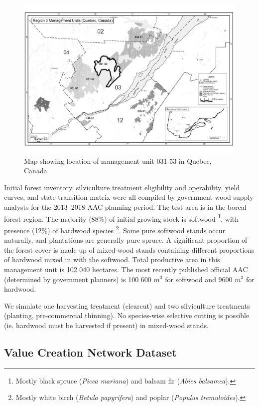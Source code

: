 \begin{figure}[ht!]
\caption{Map showing location of management unit 031-53 in Quebec, Canada}
\label{fig:uaf03153}
\centering{}\includegraphics[width=\textwidth]{images/region-03_highlight}
\end{figure}
 

Initial forest inventory, silviculture treatment eligibility and
operability, yield curves, and state transition matrix were all
compiled by government wood supply analysts for the 2013--2018 AAC
planning period. The test area is in the boreal forest region. The majority
(88\%) of initial growing stock is softwood%
\footnote{Mostly black spruce (\emph{Picea mariana}) and balsam fir
  (\emph{Abies balsamea}).%
}, with presence (12\%) of hardwood species%
\footnote{Mostly white birch (\emph{Betula papyrifera}) and poplar
  (\emph{Populus tremuloides}).%
}. Some pure softwood stands occur naturally, and plantations are
generally pure spruce. A significant proportion of the forest cover is
made up of mixed-wood stands containing different proportions of
hardwood mixed in with the softwood. Total productive area in this
management unit is 102 040 hectares. The most recently published official
AAC (determined by government planners) is 100 600 $m^{3}$ for
softwood and 9600 $m^{3}$ for hardwood.

We simulate one harvesting treatment (clearcut) and two silviculture
treatments (planting, pre-commercial thinning). No species-wise
selective cutting is possible (ie. hardwood must be harvested if
present) in mixed-wood stands.


\subsection{Value Creation Network Dataset}

